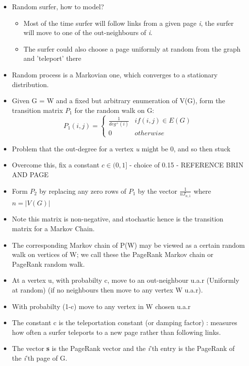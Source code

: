 \documentclass[11pt]{report}
\begin{document}
\begin{itemize}
\item Random surfer, how to model?
\begin{itemize}
\item Most of the time surfer will follow links from a given page \textit{i}, the surfer will move to one of the out-neighbours of \textit{i}. 
\item The surfer could also choose a page uniformly at random from the graph and 'teleport' there
\end{itemize}
\item Random process is a Markovian one, which converges to a stationary distribution.
\item Given G = W and a fixed but arbitrary enumeration of V(G), form the transition matrix $P_1$ for the random walk on G:
\begin{equation}
P_1(i,j) = \begin{cases} \frac{1}{deg^+(i)} & if (i,j) \in E(G) \\ 0 & otherwise\end{cases}
\end{equation}
\item Problem that the out-degree for a vertex \textit{u} might be 0, and so then stuck
\item Overcome this, fix a constant \(c \in (0,1] \) - choice of 0.15 - REFERENCE BRIN AND PAGE
\item Form $P_2$ by replacing any zero rows of $P_1$ by the vector \(\frac{1}{nJ_{n,1}}\) where \(n=|V(G)|\)
\item Note this matrix is non-negative, and stochastic hence is the transition matrix for a Markov Chain.
\item The corresponding Markov chain of P(W) may be viewed as a certain random walk on vertices of W; we call these the PageRank Markov chain or PageRank random walk.
\item At a vertex u, with probabilty c, move to an out-neighbour u.a.r (Uniformly at random) (if no neighbours then move to any vertex W u.a.r).
\item With probabilty (1-c) move to any vertex in W chosen u.a.r
\item The constant c is the teleportation constant (or damping factor) : measures how often a surfer teleports to a new page rather than following links.
\item The vector \textbf{s} is the PageRank vector and the \textit{i}'th entry is the PageRank of the \textit{i}'th page of G.
\end{itemize}
\end{document}
